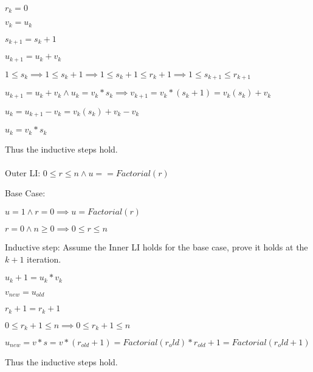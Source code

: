 \documentclass[12pt]{article}
\begin{document}
	$r_k = 0$
	
	$v_k = u_k$
	
	$s_{k+1} = s_k + 1$
	
	$u_{k+1} = u_k + v_k$
	
	
	$1 \leq s_k \implies 1 \leq s_k+1 \implies 1 \leq s_k + 1 \leq r_k + 1 \implies 1 \leq s_{k+1} \leq r_{k+1}$
	
	$u_{k+1} = u_k + v_k \land u_k = v_k * s_k \implies v_{k+1} = v_k * (s_k + 1) = v_k(s_k) + v_k$
	
	$u_k = u_{k+1} - v_k = v_k(s_k) + v_k - v_k$
	
	$u_k = v_k * s_k $
	
	Thus the inductive steps hold.\\\\
	
	Outer LI: $0 \leq r \leq n \land u == Factorial(r)$
	
	Base Case:
	
	$u = 1 \land  r = 0 \implies u = Factorial(r)$
	
	$r = 0 \land n \geq 0 \implies 0 \leq r \leq n$
	
	Inductive step: Assume the Inner LI holds for the base case, prove it holds at the $k+1$ iteration.
	
	$u_k+1 = u_k * v_k$
	
	$v_{new} = u_{old}$
	
	$r_k+1 = r_k + 1$
	
	$0 \leq r_k + 1 \leq n \implies 0 \leq r_k+1 \leq n$
	
	$u_{new} = v*s = v*(r_{old}+1) = Factorial(r_old) * r_{old}+1 = Factorial(r_old+1)$	
	
	Thus the inductive steps hold.
 
\end{document}
